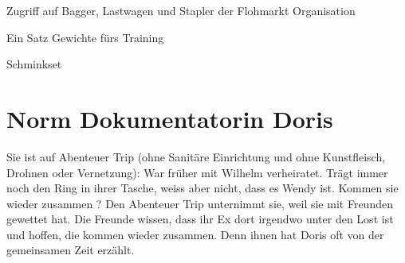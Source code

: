\begin{npcBox}[title=Wendy]
    \begin{stressSection}
    \end{stressSection}
    \begin{tabularx}{\textwidth}{ XX }
    \end{tabularx}

    \begin{consequences}
    \item {}
    \item {}
    \item {}
    \end{consequences}

    \begin{equipment}
    \item Zugriff auf Bagger, Lastwagen und Stapler der Flohmarkt Organisation
    \item Ein Satz Gewichte fürs Training
    \item Schminkset
    \end{equipment}
\end{npcBox}
\newpage

\section{Norm Dokumentatorin Doris}

Sie ist auf Abenteuer Trip (ohne Sanitäre Einrichtung und ohne Kunstfleisch, Drohnen oder Vernetzung): War früher mit Wilhelm verheiratet. Trägt immer noch den Ring in ihrer Tasche, weiss aber nicht, dass es Wendy ist. Kommen sie wieder zusammen ?
Den Abenteuer Trip unternimmt sie, weil sie mit Freunden gewettet hat. Die Freunde wissen, dass ihr Ex dort irgendwo unter den Lost ist und hoffen, die kommen wieder zusammen. Denn ihnen hat Doris oft von der gemeinsamen Zeit erzählt.

